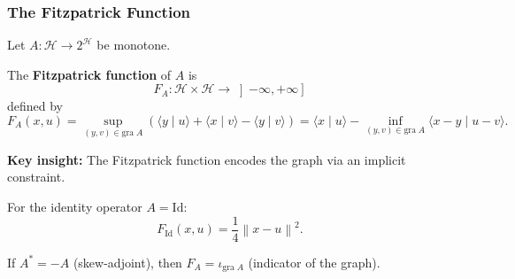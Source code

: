 \documentclass[aspectratio=169,10pt]{beamer}
\newcommand{\gra}{\mathrm{gra}\;}
\newcommand{\Id}{\mathrm{Id}}
\newcommand{\inprod}[2]{\langle #1 \mid #2 \rangle}
\newcommand{\norm}[1]{\left\|#1\right\|}
\newcommand{\Hilbert}{\mathcal{H}}
\begin{document}
\begin{frame}
    \frametitle{The Fitzpatrick Function}

    \begin{definition}[Definition 20.51]
        Let $A : \Hilbert \to 2^{\Hilbert}$ be monotone.

        The \textbf{Fitzpatrick function} of $A$ is
        \[
            F_A : \Hilbert \times \Hilbert \to \left]-\infty, +\infty\right]
        \]
        defined by
        \[
            F_A(x, u) = \sup_{(y,v) \in \gra A} \left(\inprod{y}{u} + \inprod{x}{v} - \inprod{y}{v}\right)
            = \inprod{x}{u} - \inf_{(y,v) \in \gra A} \inprod{x - y}{u - v}.
        \]
    \end{definition}

    \vspace{1em}

    \textbf{Key insight:} The Fitzpatrick function encodes the graph via an implicit constraint.

    \vspace{1em}

    \begin{example}[Example 20.52]
        For the identity operator $A = \Id$:
        \[
            F_{\Id}(x, u) = \frac{1}{4}\norm{x - u}^2.
        \]
    \end{example}

    \vspace{1em}

    \begin{example}[Example 20.53]
        If $A^* = -A$ (skew-adjoint), then $F_A = \iota_{\gra A}$ (indicator of the graph).
    \end{example}
\end{frame}
\end{document}
